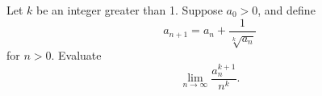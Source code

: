 Let $k$ be an integer greater than 1. Suppose $a_0 > 0$, and define
\[
a_{n+1} = a_n + \frac{1}{\sqrt[k]{a_n}}
\]
for $n > 0$. Evaluate
\[
\lim_{n \to \infty} \frac{a_n^{k+1}}{n^k}.
\]
